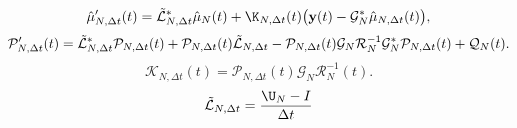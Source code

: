 \begin{equation*}
    \hat{\mu}'_{N, \Delta t}(t) = \Tilde{\mathcal{L}}_{N, \Delta t}^* \hat{\mu}_{N}(t)  + \K_{N, \Delta t}(t) \big( \mathbf{y}(t) - \mathcal{G}_N^*\hat{\mu}_{N, \Delta t}(t) \big),
\end{equation*}
\begin{equation*}
    \mathcal{P}_{N, \Delta t}'(t) = \Tilde{\mathcal{L}}_{N, \Delta t}^*\mathcal{P}_{N, \Delta t}(t) + \mathcal{P}_{N, \Delta t}(t)\Tilde{\mathcal{L}}_{N, \Delta t} - \mathcal{P}_{N, \Delta t}(t)\mathcal{G}_N\mathcal{R}_N^{-1}\mathcal{G}_N^*\mathcal{P}_{N, \Delta t}(t) + \mathcal{Q}_N(t).
\end{equation*}
\begin{equation*}
    \mathcal{K}_{N, \Delta t}(t) = \mathcal{P}_{N, \Delta t}(t)\mathcal{G}_N\mathcal{R}_N^{-1}(t).
\end{equation*}
\begin{equation*}
    \Tilde{\mathcal{L}}_{N, \Delta t} = \frac{\U_N - I}{\Delta t}
\end{equation*}

